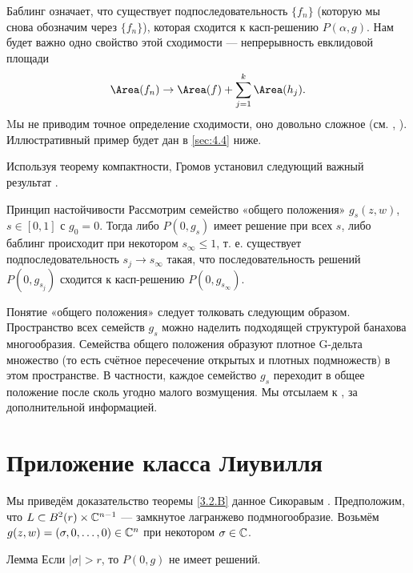 Баблинг означает, что существует подпоследовательность $\{f_n\}$ (которую мы снова обозначим через $\{f_n\}$), которая сходится к касп-решению $P(\alpha,g)$.
Нам будет важно одно свойство этой сходимости --- непрерывность
евклидовой площади
\[\Area (f_n)
\to
\Area(f)
+\sum_{j=1}^k\Area (h_j).\]
Mы не приводим точное определение сходимости, оно довольно сложное (см. \cite{G1}, \cite{AL}).
Иллюстративный пример будет дан в \ref{sec:4.4} ниже.

Используя теорему компактности, Громов установил следующий важный результат \cite{G1}.

\begin{thm*}{Принцип настойчивости}
Рассмотрим семейство «общего положения» $g_s (z, w)$, $s \in [0, 1]$ с
$g_0 = 0$. 
Тогда либо $P (0, g_s)$ имеет решение при всех $s$, либо баблинг
происходит при некотором $s_\infty \le 1$, т. е. существует
подпоследовательность  $s_j \to s_\infty$ такая, что
последовательность решений $P(0,g_{s_j})$ сходится к касп-решению $P
(0, g_{s_\infty})$. 
\end{thm*}

Понятие «общего положения» следует толковать следующим образом.
Пространство всех семейств $g_s$ можно наделить подходящей структурой
банахова многообразия. 
Семейства общего положения образуют плотное G-дельта множество (то есть счётное пересечение открытых и плотных подмножеств) в этом пространстве.
В частности, каждое семейство $g_s$ переходит в общее положение после
сколь угодно малого возмущения. 
Мы отсылаем к \cite{G1}, \cite{AL} за дополнительной информацией.



\section{Приложение класса Лиувилля}

Мы приведём доказательство теоремы \ref{3.2.B} данное Сикоравым \cite{S1}.
Предположим, что $L \subset B^2 (r) \times \mathbb{C}^{n-1}$ --- замкнутое
лагранжево подмногообразие. 
Возьмём $g (z, w) = (\sigma, 0 ,\dots, 0) \in \mathbb{C}^n$ при некотором $\sigma \in \mathbb{C}$.

\begin{thm}{Лемма}\label{4.3.A}
Если $| \sigma | > r$, то $P (0, g)$ не имеет решений.
\end{thm}


